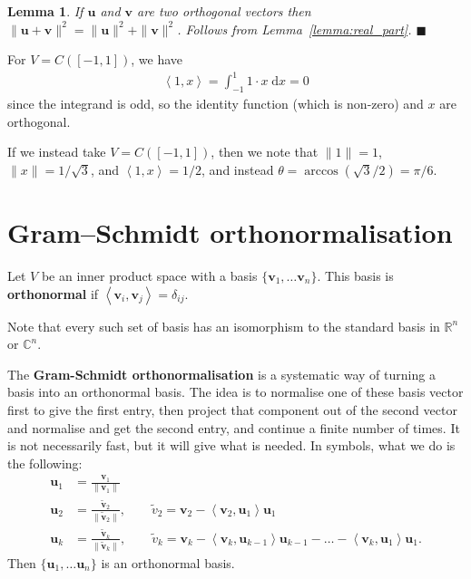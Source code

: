 \documentclass[letter-paper]{tufte-book}
\newtheorem{lemma}[theorem]{\color{pastel-blue}Lemma}
\newenvironment{example}[1][Example]{\begin{trivlist}
\item[\hskip \labelsep {\bfseries #1}]}{\end{trivlist}}
\newcommand{\inner}[2]{\left\langle #1, #2\right\rangle}
\newcommand{\ub}{{\boldsymbol{u}}}
\newcommand{\vb}{{\boldsymbol{v}}}
\newcommand{\qed}{\hfill$\blacksquare$}
\begin{document}
\begin{lemma}
  If $\ub$ and $\vb$ are two orthogonal vectors then $\|\ub + \vb\|^2 = \|\ub\|^2 + \|\vb\|^2$. Follows from Lemma~\ref{lemma:real_part}. \qed
\end{lemma}

\begin{example}
  For $V=C([-1, 1])$, we have
  \begin{align*}
    \inner{1}{x} = \int_{-1}^1 1\cdot x\; \mathrm{d}x = 0
  \end{align*}
  since the integrand is odd, so the identity function (which is non-zero) and $x$ are orthogonal.
  
  If we instead take $V=C([-1, 1])$, then we note that $\|1\| = 1$, $\|x\| = 1/\sqrt{3}$, and $\inner{1}{x} = 1/2$, and instead $\theta = \arccos(\sqrt{3}/2) = \pi/6$. 
\end{example}


\section{Gram--Schmidt orthonormalisation}

Let $V$ be an inner product space with a basis $\{\vb_1, \ldots \vb_n\}$. This basis is \textbf{orthonormal} if $\inner{\vb_i}{\vb_j} = \delta_{ij}$.

Note that every such set of basis has an isomorphism to the standard basis in $\mathbb{R}^n$ or $\mathbb{C}^n$.

The \textbf{Gram-Schmidt orthonormalisation} is a systematic way of turning a basis into an orthonormal basis. The idea is to normalise one of these basis vector first to give the first entry, then project that component out of the second vector and normalise and get the second entry, and continue a finite number of times. It is not necessarily fast, but it will give what is needed. In symbols, what we do is the following:
\begin{align*}
  \ub_1 &= \frac{\vb_1}{\|\vb_1\|}\\
  \ub_2 &= \frac{\tilde{\vb}_2}{\|\tilde{\vb}_2\|}, \qquad \tilde{v}_2 = \vb_2 - \inner{\vb_2}{\ub_1}\ub_1\\
  \ub_k &= \frac{\tilde{\vb}_k}{\|\tilde{\vb}_k\|}, \qquad \tilde{v}_k = \vb_k - \inner{\vb_k}{\ub_{k-1}}\ub_{k-1} - \ldots - \inner{\vb_k}{\ub_1}\ub_1.
\end{align*}
Then $\{\ub_1, \ldots \ub_n\}$ is an orthonormal basis.
\end{document}
